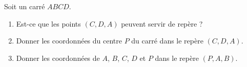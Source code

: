 
\begin{exercice}\label{exosmath-0020}

    Soit un carré \( ABCD\).
    \begin{enumerate}
        \item
            Est-ce que les points \( (C,D,A)\) peuvent servir de repère ?
        \item
            Donner les coordonnées du centre \( P\) du carré dans le repère \( (C,D,A)\).
        \item
            Donner les coordonnées de \( A\), \( B\), \( C\), \( D\) et \( P\) dans le repère \( (P,A,B)\).
    \end{enumerate}

\end{exercice}
